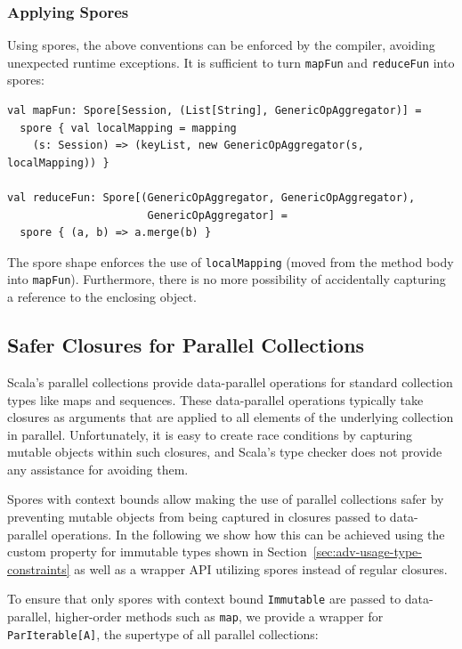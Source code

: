 \documentclass{llncs}
\begin{document}
\subsubsection{Applying Spores}

Using spores, the above conventions can be enforced by the compiler, avoiding unexpected runtime exceptions. It is sufficient to turn \verb|mapFun| and \verb|reduceFun| into spores:

\begin{lstlisting}
val mapFun: Spore[Session, (List[String], GenericOpAggregator)] =
  spore { val localMapping = mapping
    (s: Session) => (keyList, new GenericOpAggregator(s, localMapping)) }

val reduceFun: Spore[(GenericOpAggregator, GenericOpAggregator),
                      GenericOpAggregator] =
  spore { (a, b) => a.merge(b) }
\end{lstlisting}
\noindent
The spore shape enforces the use of \verb|localMapping| (moved from the method body into \verb|mapFun|). Furthermore, there is no more possibility of accidentally capturing a reference to the enclosing object.


\subsection{Safer Closures for Parallel Collections}

Scala's parallel collections provide data-parallel operations for standard collection types like maps and sequences. These data-parallel operations typically take closures as arguments that are applied to all elements of the underlying collection in parallel. Unfortunately, it is easy to create race conditions by capturing mutable objects within such closures, and Scala's type checker does not provide any assistance for avoiding them.

Spores with context bounds allow making the use of parallel collections safer by preventing mutable objects from being captured in closures passed to data-parallel operations. In the following we show how this can be achieved using the custom property for immutable types shown in Section~\ref{sec:adv-usage-type-constraints} as well as a wrapper API utilizing spores instead of regular closures.

To ensure that only spores with context bound \verb|Immutable| are passed to data-parallel, higher-order methods such as \verb|map|, we provide a wrapper for \verb|ParIterable[A]|, the supertype of all parallel collections:
\end{document}
